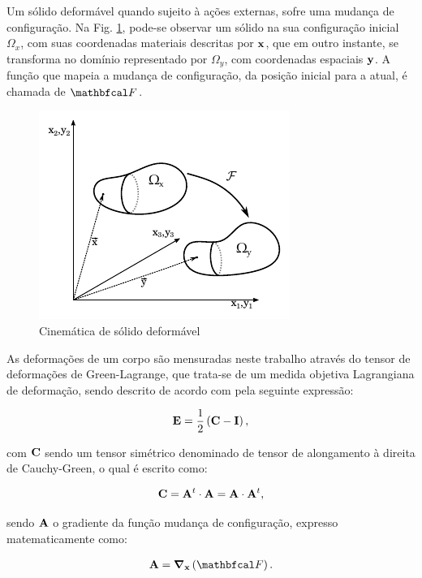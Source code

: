 \documentclass[tese_patricia]{subfiles}
\begin{document}
Um sólido deformável quando sujeito à ações externas, sofre uma mudança de configuração. Na Fig. \ref{fig:CinSol}, pode-se observar um sólido na sua configuração inicial $\Omega_{x}$, com suas coordenadas materiais descritas por $\mathbf{x}$, que em outro instante, se transforma no domínio representado por $\Omega_{y}$, com coordenadas espaciais $\mathbf{y}$. A função que mapeia a mudança de configuração, da posição inicial para a atual, é chamada de $\deformation$.

\begin{figure}[htb!]
	\centering
	\includegraphics[scale=1.7]{Imagens/Cap4/cinematica.pdf}	
	\caption{Cinemática de sólido deformável}
	\label{fig:CinSol}
\end{figure}

As deformações de um corpo são mensuradas neste trabalho através do tensor de deformações de Green-Lagrange, que trata-se de um medida objetiva Lagrangiana de deformação, sendo descrito de acordo com  pela seguinte expressão: 

\begin{align}
\mathbf{E} = \frac{1}{2}\left(\mathbf{C} - \mathbf{I}\right),
\end{align}

\noindent com $\mathbf{C}$ sendo um tensor simétrico denominado de tensor de alongamento à direita de Cauchy-Green, o qual é escrito como:

\begin{align}
\mathbf{C} = \mathbf{A}^{t} \cdot \mathbf{A} =  \mathbf{A} \cdot \mathbf{A}^{t} ,
\end{align}

\noindent sendo $ \mathbf{A}$ o gradiente da função mudança de configuração, expresso matematicamente como:

\begin{align}
\gradDeformation = \lGrad\left(\deformation\right).
\end{align}
\end{document}
